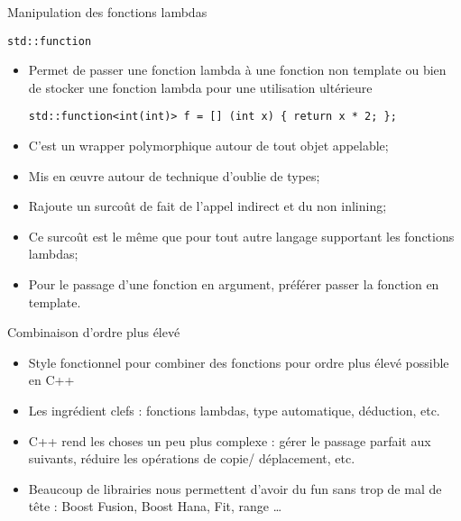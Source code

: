 \documentclass[handout,10pt]{beamer}
\begin{document}
\begin{frame}[fragile]{Manipulation des fonctions lambdas}
\tiny
\begin{block}{\lstinline$std::function$}
\begin{itemize}
 \item Permet de passer une fonction lambda à une fonction non template ou bien de stocker une fonction lambda pour
 une utilisation ultérieure
\begin{lstlisting}
std::function<int(int)> f = [] (int x) { return x * 2; };
\end{lstlisting}
\item C'est un wrapper polymorphique autour de tout objet appelable;
\item Mis en {\oe}uvre autour de technique d'oublie de types;
\item Rajoute un surcoût de fait de l'appel indirect et du non inlining;
\item Ce surcoût est le même que pour tout autre langage supportant les fonctions lambdas;
\item Pour le passage d'une fonction en argument, préférer passer la fonction en template.
\end{itemize}
\end{block}
\begin{block}{Combinaison d'ordre plus élevé}
\begin{itemize}
 \item Style fonctionnel pour combiner des fonctions pour ordre plus élevé possible en C++
 \item Les ingrédient clefs : fonctions lambdas, type automatique, déduction, etc.
 \item C++ rend les choses un peu plus complexe : gérer le passage parfait aux suivants, réduire les opérations de copie/
 déplacement, etc.
 \item Beaucoup de librairies nous permettent d'avoir du fun sans trop de mal de tête : Boost Fusion, Boost Hana, Fit, range \ldots
\end{itemize}
\end{block}
\end{frame}
\end{document}
